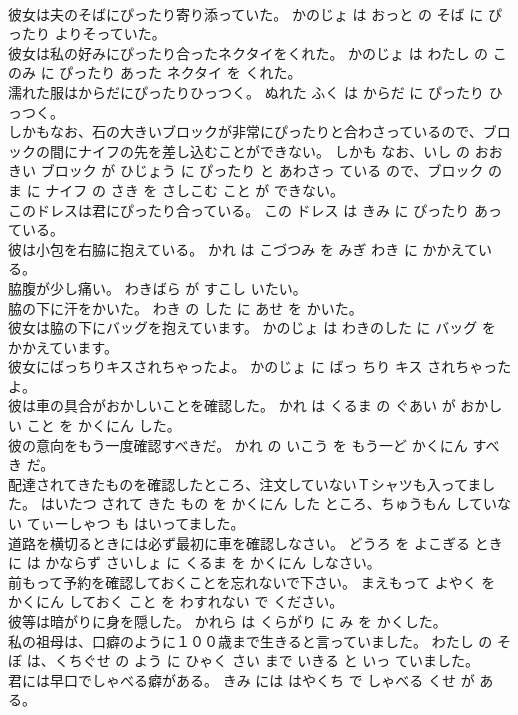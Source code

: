 \documentclass[8pt]{extreport}
\begin{document}
\begin{CJK}{UTF8}{min}
\\	彼女は夫のそばにぴったり寄り添っていた。	かのじょ は おっと の そば に ぴったり よりそっていた。	
\\	彼女は私の好みにぴったり合ったネクタイをくれた。	かのじょ は わたし の このみ に ぴったり あった ネクタイ を くれた。	
\\	濡れた服はからだにぴったりひっつく。	ぬれた ふく は からだ に ぴったり ひっつく。	
\\	しかもなお、石の大きいブロックが非常にぴったりと合わさっているので、ブロックの間にナイフの先を差し込むことができない。	しかも なお、いし の おおきい ブロック が ひじょう に ぴったり と あわさっ ている ので、ブロック の ま に ナイフ の さき を さしこむ こと が できない。	
\\	このドレスは君にぴったり合っている。	この ドレス は きみ に ぴったり あっている。	
\\	彼は小包を右脇に抱えている。	かれ は こづつみ を みぎ わき に かかえている。	
\\	脇腹が少し痛い。	わきばら が すこし いたい。	
\\	脇の下に汗をかいた。	わき の した に あせ を かいた。	
\\	彼女は脇の下にバッグを抱えています。	かのじょ は わきのした に バッグ を かかえています。	
\\	彼女にばっちりキスされちゃったよ。	かのじょ に ばっ ちり キス されちゃった よ。	
\\	彼は車の具合がおかしいことを確認した。	かれ は くるま の ぐあい が おかしい こと を かくにん した。	
\\	彼の意向をもう一度確認すべきだ。	かれ の いこう を もう一ど かくにん すべき だ。	
\\	配達されてきたものを確認したところ、注文していないＴシャツも入ってました。	はいたつ されて きた もの を かくにん した ところ、ちゅうもん していない てぃーしゃつ も はいってました。	
\\	道路を横切るときには必ず最初に車を確認しなさい。	どうろ を よこぎる とき に は かならず さいしょ に くるま を かくにん しなさい。	
\\	前もって予約を確認しておくことを忘れないで下さい。	まえもって よやく を かくにん しておく こと を わすれない で ください。	
\\	彼等は暗がりに身を隠した。	かれら は くらがり に み を かくした。	
\\	私の祖母は、口癖のように１００歳まで生きると言っていました。	わたし の そぼ は、くちぐせ の よう に ひゃく さい まで いきる と いっ ていました。	
\\	君には早口でしゃべる癖がある。	きみ には はやくち で しゃべる くせ が ある。	

\end{CJK}
\end{document}
